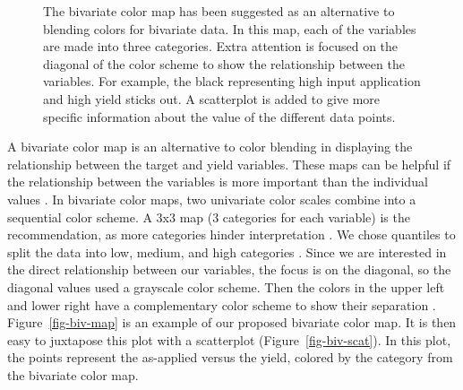 \documentclass[
  authoryear,
  preprint,
  3p]{elsarticle}
\begin{document}
\begin{figure}
\begin{minipage}[t]{0.35\linewidth}
{{}

}

\end{minipage}%

\caption{\label{fig-biv-color}The bivariate color map has been suggested
as an alternative to blending colors for bivariate data. In this map,
each of the variables are made into three categories. Extra attention is
focused on the diagonal of the color scheme to show the relationship
between the variables. For example, the black representing high input
application and high yield sticks out. A scatterplot is added to give
more specific information about the value of the different data points.}

\end{figure}

A bivariate color map is an alternative to color blending in displaying
the relationship between the target and yield variables. These maps can
be helpful if the relationship between the variables is more important
than the individual values \citep{elmer2013symbol}. In bivariate color
maps, two univariate color scales combine into a sequential color
scheme. A 3x3 map (3 categories for each variable) is the
recommendation, as more categories hinder interpretation
\citep{Leonowicz2003RESEARCHOT}. We chose quantiles to split the data
into low, medium, and high categories \citep{biesecker-2020}. Since we
are interested in the direct relationship between our variables, the
focus is on the diagonal, so the diagonal values used a grayscale color
scheme. Then the colors in the upper left and lower right have a
complementary color scheme to show their separation \citep{strode-2020}.
Figure~\ref{fig-biv-map} is an example of our proposed bivariate color
map. It is then easy to juxtapose this plot with a scatterplot
(Figure~\ref{fig-biv-scat}). In this plot, the points represent the
as-applied versus the yield, colored by the category from the bivariate
color map.
\end{document}

